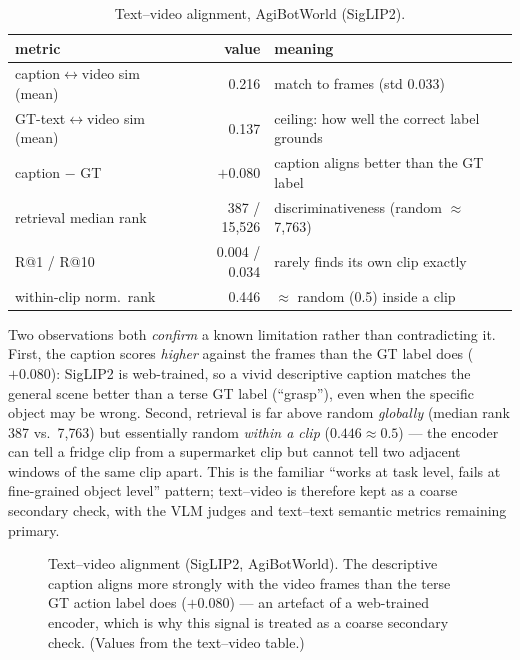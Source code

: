 \documentclass[10pt,letterpaper]{article}
\begin{document}
\begin{table}[H]
\centering
\caption{Text--video alignment, AgiBotWorld (SigLIP2).}
\begin{tabular}{lr l}
\toprule
metric & value & meaning \\
\midrule
caption$\leftrightarrow$video sim (mean) & 0.216 & match to frames (std 0.033) \\
GT-text$\leftrightarrow$video sim (mean) & 0.137 & ceiling: how well the correct label grounds \\
caption $-$ GT            & $+0.080$ & caption aligns better than the GT label \\
retrieval median rank    & 387 / 15{,}526 & discriminativeness (random $\approx$ 7{,}763) \\
R@1 / R@10               & 0.004 / 0.034 & rarely finds its own clip exactly \\
within-clip norm.\ rank  & 0.446 & $\approx$ random (0.5) inside a clip \\
\bottomrule
\end{tabular}
\end{table}

Two observations both \emph{confirm} a known limitation rather than contradicting it. First, the
caption scores \emph{higher} against the frames than the GT label does ($+0.080$): SigLIP2 is
web-trained, so a vivid descriptive caption matches the general scene better than a terse GT label
(``grasp''), even when the specific object may be wrong. Second, retrieval is far above random
\emph{globally} (median rank 387 vs.\ 7{,}763) but essentially random \emph{within a clip}
($0.446 \approx 0.5$) --- the encoder can tell a fridge clip from a supermarket clip but cannot
tell two adjacent windows of the same clip apart. This is the familiar ``works at task level,
fails at fine-grained object level'' pattern; text--video is therefore kept as a coarse secondary
check, with the VLM judges and text--text semantic metrics remaining primary.

\begin{figure}[H]
\centering
{}
\caption{Text--video alignment (SigLIP2, AgiBotWorld). The descriptive caption aligns more
strongly with the video frames than the terse GT action label does ($+0.080$) --- an artefact of a
web-trained encoder, which is why this signal is treated as a coarse secondary check. (Values from
the text--video table.)}
\end{figure}
\end{document}
